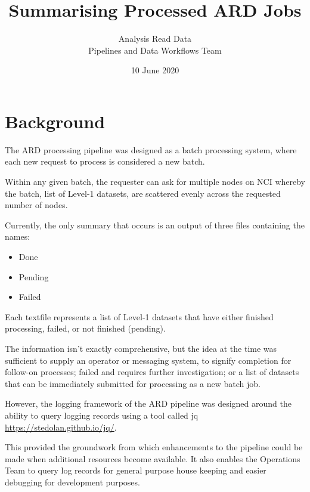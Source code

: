 \documentclass[a4paper,oneside,titlepage]{article}
\title{Summarising Processed ARD Jobs}
\date{10 June 2020}
\author{Analysis Read Data\\ Pipelines and Data Workflows Team}
\begin{document}
  \maketitle
  \newpage

  \tableofcontents

  \newpage

  \section{Background}

    \begin{flushleft}
      The ARD processing pipeline was designed as a batch processing system, where each new request to process is considered a new batch. \par
      Within any given batch, the requester can ask for multiple nodes on NCI whereby the batch, list of Level-1 datasets, are scattered evenly across the requested number of nodes. \par
      Currently, the only summary that occurs is an output of three files containing the names:
    \end{flushleft}

    \begin{itemize}
      \item Done
      \item Pending
      \item Failed
    \end{itemize}

    \begin{flushleft}
      Each textfile represents a list of Level-1 datasets that have either finished processing, failed, or not finished (pending). \par
      The information isn't exactly comprehensive, but the idea at the time was sufficient to supply an operator or messaging system, to signify completion for follow-on processes; failed and requires further investigation; or a list of datasets that can be immediately submitted for processing as a new batch job. \par
      However, the logging framework of the ARD pipeline was designed around the ability to query logging records using a tool called jq \url{https://stedolan.github.io/jq/}. \par
      This provided the groundwork from which enhancements to the pipeline could be made when additional resources become available. It also enables the Operations Team to query log records for general purpose house keeping and easier debugging for development purposes.
    \end{flushleft}
\end{document}
